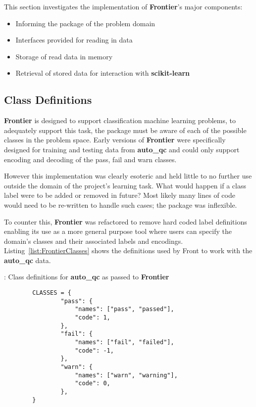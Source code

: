 This section investigates the implementation of \textbf{Frontier}'s major components:

\begin{itemize}
    \item Informing the package of the problem domain
    \item Interfaces provided for reading in data
    \item Storage of read data in memory
    \item Retrieval of stored data for interaction with \textbf{scikit-learn}
\end{itemize}


\subsection{Class Definitions}
\label{chap:classes}

\textbf{Frontier} is designed to support classification machine learning problems, to
adequately support this task, the package must be aware of each of the possible
classes in the problem space. Early versions of \textbf{Frontier} were specifically
designed for training and testing data from \textbf{auto\_qc} and could only
support encoding and decoding of the pass, fail and warn classes.

However this implementation was clearly esoteric and held little to no further
use outside the domain of the project's learning task. What would happen if a
class label were to be added or removed in future? Most likely many lines of
code would need to be re-written to handle such cases; the package was
inflexible.

To counter this, \textbf{Frontier} was refactored to remove hard coded label definitions
enabling its use as a more general purpose tool where users can specify the
domain's classes and their associated labels and encodings.
Listing~\ref{list:FrontierClasses} shows the definitions used by Front to work
with the \textbf{auto\_qc} data.

\begin{listing}[H]
    \caption[FrontierClasses]{: Class definitions for \textbf{auto\_qc} as passed to \textbf{Frontier}}
    \label{list:FrontierClasses}
    \begin{verbatim}
        CLASSES = {
                "pass": {
                    "names": ["pass", "passed"],
                    "code": 1,
                },
                "fail": {
                    "names": ["fail", "failed"],
                    "code": -1,
                },
                "warn": {
                    "names": ["warn", "warning"],
                    "code": 0,
                },
        }
    \end{verbatim}
\end{listing}

